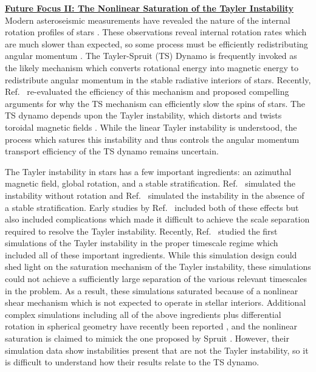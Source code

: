 \documentclass[12pt]{article}
\newcommand{\sct}[1]{\vspace{0.3cm}\hspace{-\parindent}\textbf{\underline{#1}}\hspace{0.3cm}}
\begin{document}
\newpage
\sct{Future Focus II: The Nonlinear Saturation of the Tayler Instability}
Modern asteroseismic measurements have revealed the nature of the internal rotation profiles of stars \citep{beck_etal_2012,saio_etal_2015,hermes_etal_2017}.
These observations reveal internal rotation rates which are much slower than expected, so some process must be efficiently redistributing angular momentum \citep{ji_etal_2022}.
The Tayler-Spruit (TS) Dynamo \citep{spruit2002} is frequently invoked as the likely mechanism which converts rotational energy into magnetic energy to redistribute angular momentum in the stable radiative interiors of stars.
Recently, Ref.~\citep{fuller_etal_2019} re-evaluated the efficiency of this mechanism and proposed compelling arguments for why the TS mechanism can efficiently slow the spins of stars.
The TS dynamo depends upon the Tayler instability, which distorts and twists toroidal magnetic fields \citep{spruit1999}.
While the linear Tayler instability is understood, the process which satures this instability and thus controls the angular momentum transport efficiency of the TS dynamo remains uncertain.

The Tayler instability in stars has a few important ingredients: an azimuthal magnetic field, global rotation, and a stable stratification.
Ref.~\citep{guerrero_etal_2019} simulated the instability without rotation and Ref.~\citep{weber_etal_2015} simulated the instability in the absence of a stable stratification.
Early studies by Ref.~\citep{braithwaite2006} included both of these effects but also included complications which made it difficult to achieve the scale separation required to resolve the Tayler instability.
Recently, Ref.~\citep{ji_etal_2022} studied the first simulations of the Tayler instability in the proper timescale regime which included all of these important ingredients.
While this simulation design could shed light on the saturation mechanism of the Tayler instability, these simulations could not achieve a sufficiently large separation of the various relevant timescales in the problem.
As a result, these simulations saturated because of a nonlinear shear mechanism which is not expected to operate in stellar interiors.
Additional complex simulations including all of the above ingredients plus differential rotation in spherical geometry have recently been reported \citep{petitdemange_etal_2022}, and the nonlinear saturation is claimed to mimick the one proposed by Spruit \citep{spruit2002}.
However, their simulation data show instabilities present that are not the Tayler instability, so it is difficult to understand how their results relate to the TS dynamo.
\end{document}
